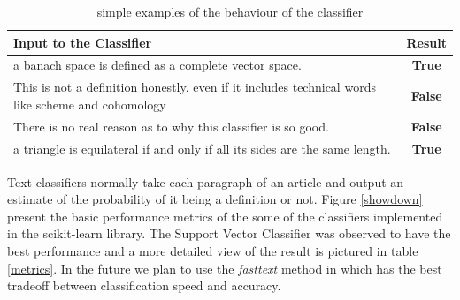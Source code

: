 \documentclass[a4paper]{easychair}
\begin{document}
\begin{table}[h]
    \begin{center}
    \begin{tabular}{|p{}|c|}
        \hline
        \hline
        \textbf{Input to the Classifier} & \textbf{Result} \\
        \hline
        \hline
        a banach space is defined as a complete vector space. & \textbf{True}\\
        \hline
        This is not a definition honestly. even if it includes technical words like scheme and cohomology & \textbf{False} \\
        \hline
        There is no real reason as to why this classifier is so good. & \textbf{False}\\
        \hline
        a triangle is equilateral if and only if all its sides are the same length. & \textbf{True}\\
        \hline
    \end{tabular}
    \caption{\label{sanity}simple examples of the behaviour of the classifier}
    \end{center} 
\end{table}

 Text classifiers normally take each paragraph of an article and output an estimate of the probability of it being a definition or not.  Figure \ref{showdown} present the basic performance metrics of the some of the classifiers implemented in the scikit-learn library. The Support Vector Classifier was observed to have the best performance and a more detailed view of the result is pictured in table \ref{metrics}. In the future we plan  to use the \textit{fasttext} method in \cite{bagof} which has the best tradeoff between classification speed and accuracy.  
\end{document}
